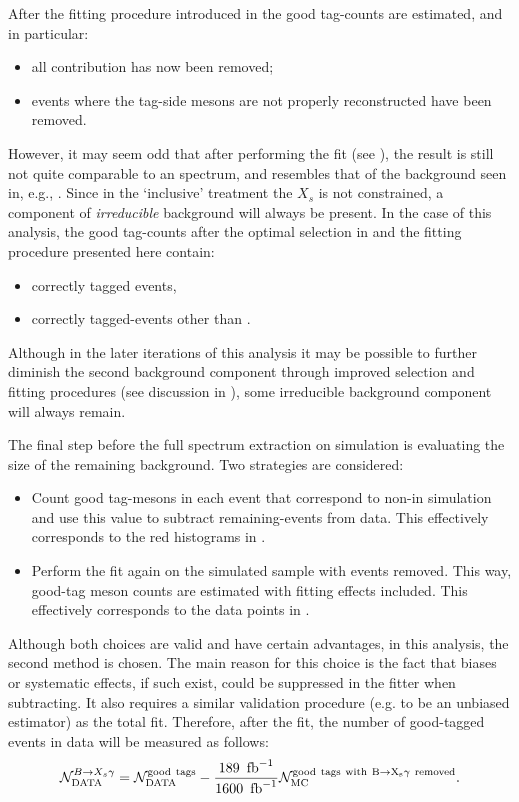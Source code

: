 After the fitting procedure introduced in  the good tag-\B counts are estimated, and in particular:
\begin{itemize}
    \item all \epem\ra\qqbar contribution has now been removed;
    \item events where the tag-side \B mesons are not properly reconstructed have been removed.
\end{itemize}

However, it may seem odd that after performing the \Mbc fit (see ), the result is still not quite comparable to an \EB spectrum,
and resembles that of the background seen in, e.g., .
Since in the `inclusive' treatment the $X_s$ is not constrained, a component of \textit{irreducible} background will always be present.
In the case of this analysis, the good tag-\B counts after the optimal selection in  and the fitting procedure presented here contain:
\begin{itemize}
    \item correctly tagged \BtoXsgamma events,
    \item correctly tagged-\BB events other than \BtoXsgamma.
\end{itemize}
Although in the later iterations of this analysis it may be possible to further diminish the second background component through improved selection and fitting procedures (see discussion in ), 
some irreducible background component will always remain.

The final step before the full \BtoXsgamma spectrum extraction on simulation is evaluating the size of the remaining \BB background.
Two strategies are considered:
\begin{itemize}
    \item Count good tag-\B mesons in each event that correspond to non-\BtoXsgamma in simulation and use this value to subtract remaining-\BB events from data.
    This effectively corresponds to the red histograms in .
    \item Perform the fit again on the simulated sample with \BtoXsgamma events removed.
    This way, good-tag \B meson counts are estimated with fitting effects included.
    This effectively corresponds to the data points in .
\end{itemize}
Although both choices are valid and have certain advantages, in this analysis, the second method is chosen.
The main reason for this choice is the fact that biases or systematic effects, if such exist, could be suppressed in the fitter when subtracting.
It also requires a similar validation procedure (e.g. to be an unbiased estimator) as the total fit.
Therefore, after the \Mbc fit, the number of good-tagged \BtoXsgamma events in data will be measured as follows:
\begin{equation}\label{eq:background_subtraction}
    \mathcal{N}_{\mathrm{DATA}}^{\BtoXsgamma} = \mathcal{N}_{\mathrm{DATA}}^{\mathrm{good~tags}}  - \frac{189~\invfb}{1600~\invfb} \mathcal{N}_{\mathrm{MC}}^{\mathrm{good~tags~with~\BtoXsgamma~removed}}.
\end{equation}
